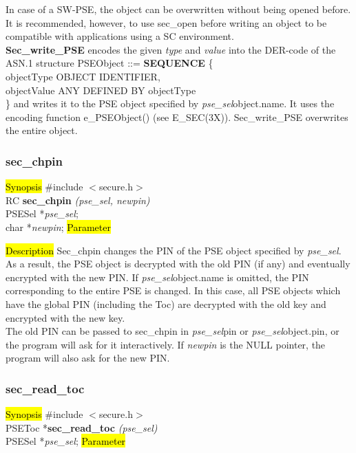 In case of a SW-PSE, the object can be overwritten without being opened before. It is recommended, however,
to use sec\_open before writing an object to be compatible with applications using
a SC environment. \\ [1em]
{\bf Sec\_write\_PSE} encodes the given {\em type} and {\em value} into the DER-code of the 
ASN.1 structure
\bc
{\small
\bvtab
PSEObject ::= \3 {\bf SEQUENCE} \{ \\
\5 objectType \3 OBJECT IDENTIFIER, \\
\5 objectValue \3 ANY DEFINED BY objectType \\
\3 \}
\evtab
}
\ec
and writes it to the PSE object specified by {\em pse\_sel}\pf object.name. It uses the encoding function
e\_PSEObject() (see E\_SEC(3X)). Sec\_write\_PSE overwrites the entire object.

\subsubsection{sec\_chpin}
\label{sec_chpin}
\hl{Synopsis}
\#include $<$secure.h$>$ \\ [0.5cm]
RC {\bf sec\_chpin} {\em (pse\_sel, newpin)} \\
PSESel *{\em pse\_sel}; \\
char *{\em newpin};
\hl{Parameter}


\hl{Description}
Sec\_chpin changes the PIN of the PSE object specified by {\em pse\_sel}.
As a result, the PSE object is decrypted with the old PIN (if any) and eventually
encrypted with the new PIN.
If {\em pse\_sel}\pf object.name is omitted, the PIN corresponding to the entire
PSE is changed. In this case, all PSE objects which have the global PIN (including the
Toc) are decrypted with the old key and encrypted with the new key.\\
The old PIN can be passed to sec\_chpin in {\em pse\_sel}\pf pin or {\em pse\_sel}\pf object.pin,
or the program will ask for it interactively.
If {\em newpin} is the NULL pointer, the program will also ask for the new PIN.

\subsubsection{sec\_read\_toc}
\label{sec_read_toc}
\hl{Synopsis}
\#include $<$secure.h$>$ \\ [0.5cm]
PSEToc *{\bf sec\_read\_toc} {\em (pse\_sel)} \\
PSESel *{\em pse\_sel};
\hl{Parameter}

